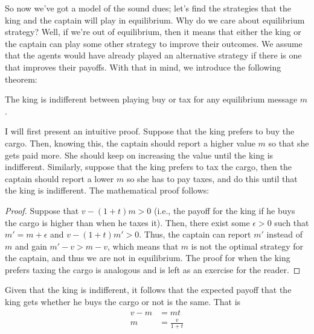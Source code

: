 So now we've got a model of the sound dues; let's find the strategies that the king and the captain will play in equilibrium. Why do we care about equilibrium strategy? Well, if we're out of equilibrium, then it means that either the king or the captain can play some other strategy to improve their outcomes. We assume that the agents would have already played an alternative strategy if there is one that improves their payoffs. With that in mind, we introduce the following theorem:

\begin{theorem}
    The king is indifferent between playing buy or tax for any equilibrium message $m$.
\end{theorem}
I will first present an intuitive proof. Suppose that the king prefers to buy the cargo. Then, knowing this, the captain should report a higher value $m$ so that she gets paid more. She should keep on increasing the value until the king is indifferent. Similarly, suppose that the king prefers to tax the cargo, then the captain should report a lower $m$ so she has to pay taxes, and do this until that the king is indifferent. The mathematical proof follows:
\begin{proof}
    Suppose that $v - (1 + t)m > 0$ (i.e., the payoff for the king if he buys the cargo is higher than when he taxes it). Then, there exist some $\epsilon > 0$ such that $m' = m + \epsilon$ and $v - (1 + t)m' > 0$. Thus, the captain can report $m'$ instead of $m$ and gain $m'-v > m - v$, which means that $m$ is not the optimal strategy for the captain, and thus we are not in equilibrium. The proof for when the king prefers taxing the cargo is analogous and is left as an exercise for the reader. 
\end{proof}

Given that the king is indifferent, it follows that the expected payoff that the king gets whether he buys the cargo or not is the same. That is
\begin{align*}
    v - m &= mt \\
    m &= \frac{v}{1 + t}
\end{align*}

